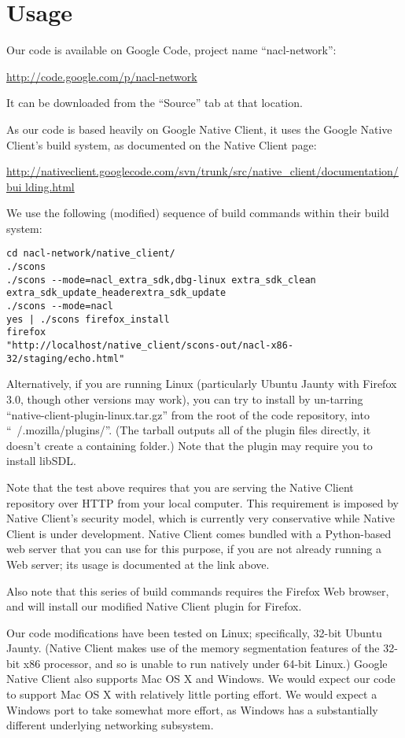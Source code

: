 \documentclass[a4paper,10pt]{article}
\begin{document}
\section{Usage}

Our code is available on Google Code, project name ``nacl-network'':

\url{http://code.google.com/p/nacl-network}

It can be downloaded from the ``Source'' tab at that location.

As our code is based heavily on Google Native Client, it uses the Google Native
Client's build system, as documented on the Native Client page:

\url{
http://nativeclient.googlecode.com/svn/trunk/src/native_client/documentation/bui
lding.html}

We use the following (modified) sequence of build commands within their build
system:

\begin{verbatim}
cd nacl-network/native_client/
./scons
./scons --mode=nacl_extra_sdk,dbg-linux extra_sdk_clean
extra_sdk_update_headerextra_sdk_update
./scons --mode=nacl
yes | ./scons firefox_install
firefox
"http://localhost/native_client/scons-out/nacl-x86-32/staging/echo.html"
\end{verbatim}

Alternatively, if you are running Linux (particularly Ubuntu Jaunty with
Firefox 3.0, though other versions may work), you can try to install by
un-tarring ``native-client-plugin-linux.tar.gz'' from the root of the code
repository, into ``~/.mozilla/plugins/''.  (The tarball outputs all of the
plugin files directly, it doesn't create a containing folder.)  Note that the
plugin may require you to install libSDL.

Note that the test above requires that you are serving the Native Client
repository over HTTP from your local computer.  This requirement is imposed
by Native Client's security model, which is currently very conservative while
Native Client is under development. Native Client comes bundled with a
Python-based web server that you can use for this purpose, if you are not
already running a Web server; its usage is documented at the link above.

Also note that this series of build commands requires the Firefox Web browser,
and will install our modified Native Client plugin for Firefox.

Our code modifications have been tested on Linux; specifically, 32-bit Ubuntu
Jaunty.  (Native Client makes use of the memory segmentation features of
the 32-bit x86 processor, and so is unable to run natively under 64-bit Linux.)
Google Native Client also supports Mac OS X and Windows. We would expect our
code to support Mac OS X with relatively little porting effort. We would expect
a Windows port to take somewhat more effort, as Windows has a substantially
different underlying networking subsystem.
\end{document}

